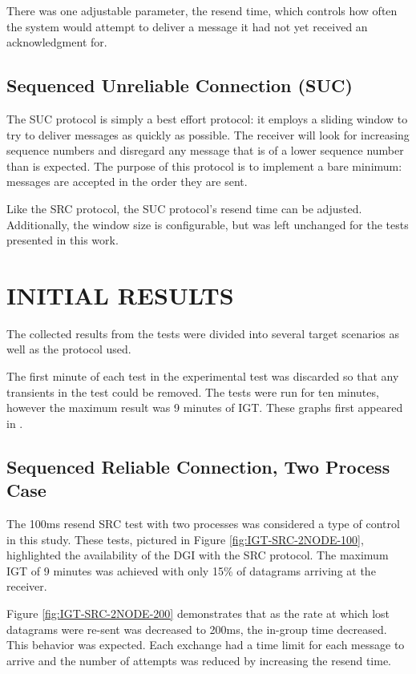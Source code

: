 There was one adjustable parameter, the resend time, which controls how often the system would attempt to deliver a message it had not yet received an acknowledgment for.

\subsection{Sequenced Unreliable Connection (SUC)}

The \ac{SUC} protocol is simply a best effort protocol: it employs a sliding window to try to deliver messages as quickly as possible.
The receiver will look for increasing sequence numbers and disregard any message that is of a lower sequence number than is expected. The purpose of this protocol is to implement a bare minimum: messages are accepted in the order they are sent.

Like the \ac{SRC} protocol, the SUC protocol's resend time can be adjusted. Additionally, the window size is configurable, but was left unchanged for the tests presented in this work.

\section{INITIAL RESULTS}

The collected results from the tests were divided into several target scenarios as well as the protocol used.

The first minute of each test in the experimental test was discarded so that any transients in the test could be removed.
The tests were run for ten minutes, however the maximum result was 9 minutes of \ac{IGT}.
These graphs first appeared in \cite{CRITIS2012}.

\subsection{Sequenced Reliable Connection, Two Process Case}


The 100ms resend SRC test with two processes was considered a type of control in this study.
These tests, pictured in Figure \ref{fig:IGT-SRC-2NODE-100}, highlighted the availability of the DGI with the SRC protocol.
The maximum \ac{IGT} of 9 minutes was achieved with only 15\% of datagrams arriving at the receiver. 

Figure \ref{fig:IGT-SRC-2NODE-200} demonstrates that as the rate at which lost datagrams were re-sent was decreased to 200ms, the in-group time decreased.
This behavior was expected.
Each exchange had a time limit for each message to arrive and the number of attempts was reduced by increasing the resend time.

